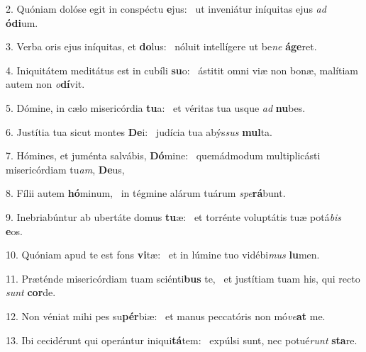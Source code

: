 2. Quóniam dolóse egit in conspéctu \textbf{e}jus: \ast\  ut inveniátur iníquitas ejus \textit{ad} \textbf{ó}\textbf{di}um.\

3. Verba oris ejus iníquitas, et \textbf{do}lus: \ast\  nóluit intellígere ut be\textit{ne} \textbf{á}\textbf{ge}ret.\

4. Iniquitátem meditátus est in cubíli \textbf{su}o: \ast\  ástitit omni viæ non bonæ, malítiam autem non \textit{o}\textbf{dí}vit.\

5. Dómine, in cælo misericórdia \textbf{tu}a: \ast\  et véritas tua usque \textit{ad} \textbf{nu}bes.\

6. Justítia tua sicut montes \textbf{De}i: \ast\  judícia tua abýs\textit{sus} \textbf{mul}ta.\

7. Hómines, et juménta salvábis, \textbf{Dó}mine: \ast\  quemádmodum multiplicásti misericórdiam tu\textit{am}, \textbf{De}us,\

8. Fílii autem \textbf{hó}minum, \ast\  in tégmine alárum tuárum \textit{spe}\textbf{rá}bunt.\

9. Inebriabúntur ab ubertáte domus \textbf{tu}æ: \ast\  et torrénte voluptátis tuæ potá\textit{bis} \textbf{e}os.\

10. Quóniam apud te est fons \textbf{vi}tæ: \ast\  et in lúmine tuo vidébi\textit{mus} \textbf{lu}men.\

11. Præténde misericórdiam tuam sciénti\textbf{bus} te, \ast\  et justítiam tuam his, qui recto \textit{sunt} \textbf{cor}de.\

12. Non véniat mihi pes su\textbf{pér}biæ: \ast\  et manus peccatóris non mó\textit{ve}\textbf{at} me.\

13. Ibi cecidérunt qui operántur iniqui\textbf{tá}tem: \ast\  expúlsi sunt, nec potué\textit{runt} \textbf{sta}re.\


